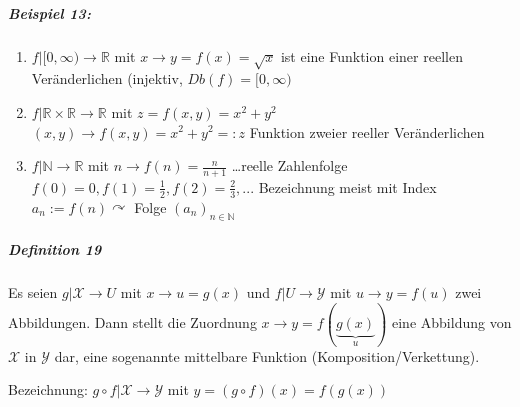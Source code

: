 \documentclass[a4paper]{scrartcl}
\begin{document}
\subparagraph{Beispiel 13:}
\begin{enumerate}
\item $f|[0,\infty ) \rightarrow \mathbb{R}$ mit $x\rightarrow y = f(x) = \sqrt{x}$ ist eine Funktion einer reellen Veränderlichen (injektiv, $Db(f)=[0,\infty )$

\item $f| \mathbb{R} \times \mathbb{R} \rightarrow \mathbb{R}$ mit $z=f(x,y)=x^2 +y^2$\\
$(x,y) \rightarrow f(x,y) = x^2 +y^2 =:z$
Funktion zweier reeller Veränderlichen

\item $f|\mathbb{N} \rightarrow \mathbb{R}$ mit $n \rightarrow f(n) = \frac{n}{n+1}$ \dots reelle Zahlenfolge $f(0) = 0, f(1) = \frac{1}{2}, f(2) = \frac{2}{3}, ...$
Bezeichnung meist mit Index $a_n := f(n) \curvearrowright$ Folge $(a_n)_{n \in \mathbb{N}}$
\end{enumerate}


\subparagraph{Definition 19} Es seien $g|\mathcal{X} \rightarrow U$ mit $x \rightarrow u = g(x)$ und $f|U \rightarrow \mathcal{Y}$ mit $u \rightarrow y = f(u)$ zwei Abbildungen. Dann stellt die Zuordnung $x \rightarrow y = f(\underbrace{g(x)}_{u})$ eine Abbildung von $\mathcal{X}$ in $\mathcal{Y}$ dar, eine sogenannte mittelbare Funktion (Komposition/Verkettung).

Bezeichnung: $g \circ f | \mathcal{X} \rightarrow \mathcal{Y}$ mit $y=(g\circ f)(x) = f(g(x))$
\end{document}
